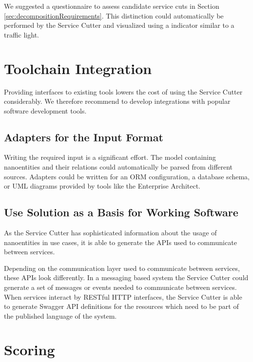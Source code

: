 We suggested a questionnaire to assess candidate service cuts in Section \ref{sec:decompositionRequirements}. This distinction could automatically be performed by the Service Cutter and visualized using a indicator similar to a traffic light.

\section{Toolchain Integration}

Providing interfaces to existing tools lowers the cost of using the Service Cutter considerably. We therefore recommend to develop integrations with popular software development tools.

\subsection{Adapters for the Input Format}

Writing the required input is a significant effort. The model containing nanoentities and their relations could automatically be parsed from different sources. Adapters could be written for an \gls{ORM} configuration, a database schema, or \gls{UML} diagrams provided by tools like the Enterprise Architect\cite{entArch}.


\subsection{Use Solution as a Basis for Working Software}

As the Service Cutter has sophisticated information about the usage of nanoentities in use cases, it is able to generate the APIs used to communicate between services. 

Depending on the communication layer used to communicate between services, these \gls{API}s look differently. In a messaging based system the Service Cutter could generate a set of messages or events needed to communicate between services. When services interact by RESTful HTTP interfaces, the Service Cutter is able to generate Swagger\cite{swagger} \gls{API} definitions for the resources which need to be part of the published language of the system. 

\section{Scoring}

